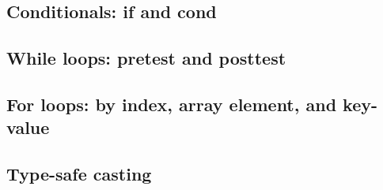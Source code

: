 \documentclass{article}
\theoremstyle{definition}
\begin{document}
\hypertarget{hsec:conditionals}{}
\subsection{Conditionals: if and cond}
\label{sec:conditionals}


\hypertarget{hsec:whileloops}{}
\subsection{While loops: pretest and posttest}
\label{sec:whileloops}


\hypertarget{hsec:forloops}{}
\subsection{For loops: by index, array element, and key-value}
\label{sec:forloops}


\hypertarget{hsec:casting}{}
\subsection{Type-safe casting}
\label{sec:casting}
\end{document}
